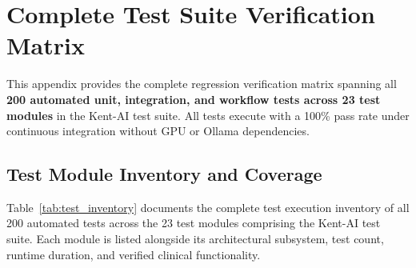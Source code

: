 
\chapter{Complete Test Suite Verification Matrix}
\label{AppendixC}

This appendix provides the complete regression verification matrix spanning all \textbf{200 automated unit, integration, and workflow tests across 23 test modules} in the Kent-AI test suite. All tests execute with a 100\% pass rate under continuous integration without GPU or Ollama dependencies.


\section{Test Module Inventory and Coverage}

Table~\ref{tab:test_inventory} documents the complete test execution inventory of all 200 automated tests across the 23 test modules comprising the Kent-AI test suite. Each module is listed alongside its architectural subsystem, test count, runtime duration, and verified clinical functionality.

